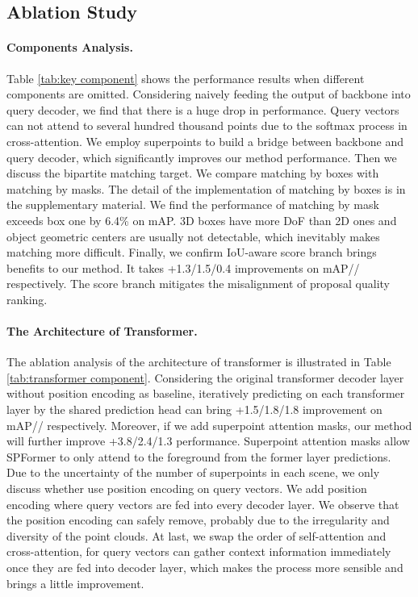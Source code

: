 \documentclass[letterpaper]{article} \usepackage{aaai23}  \usepackage{times}  \usepackage{helvet}  \usepackage{courier}  \usepackage[hyphens]{url}  \usepackage{graphicx} \urlstyle{rm} \def\UrlFont{\rm}  \usepackage{natbib}  \usepackage{caption} \frenchspacing  \setlength{\pdfpagewidth}{8.5in}  \setlength{\pdfpageheight}{11in}  \usepackage{algorithm}
\begin{document}
\subsection{Ablation Study}
\paragraph{Components Analysis.} Table \ref{tab:key component} shows the performance results when different components are omitted. Considering naively feeding the output of backbone into query decoder, we find that there is a huge drop in performance. Query vectors can not attend to several hundred thousand points due to the softmax process in cross-attention. We employ superpoints to build a bridge between backbone and query decoder, which significantly improves our method performance. Then we discuss the bipartite matching target. We compare matching by boxes with matching by masks. The detail of the implementation of matching by boxes is in the supplementary material. We find the performance of matching by mask exceeds box one by 6.4\% on mAP. 3D boxes have more DoF than 2D ones and object geometric centers are usually not detectable, which inevitably makes matching more difficult. Finally, we confirm IoU-aware score branch brings benefits to our method. It takes +1.3/1.5/0.4 improvements on mAP// respectively. The score branch mitigates the misalignment of proposal quality ranking.

\paragraph{The Architecture of Transformer.} The ablation analysis of the architecture of transformer is illustrated in Table \ref{tab:transformer component}. Considering the original transformer decoder layer \cite{transformer} without position encoding as baseline, iteratively predicting on each transformer layer by the shared prediction head can bring +1.5/1.8/1.8 improvement on mAP// respectively. Moreover, if we add superpoint attention masks, our method will further improve +3.8/2.4/1.3  performance. Superpoint attention masks allow SPFormer to only attend to the foreground from the former layer predictions. Due to the uncertainty of the number of superpoints in each scene, we only discuss whether use position encoding on query vectors. We add position encoding where query vectors are fed into every decoder layer. We observe that the position encoding can safely remove, probably due to the irregularity and diversity of the point clouds. At last, we swap the order of self-attention and cross-attention, for query vectors can gather context information immediately once they are fed into decoder layer, which makes the process more sensible and brings a little improvement.
\end{document}
